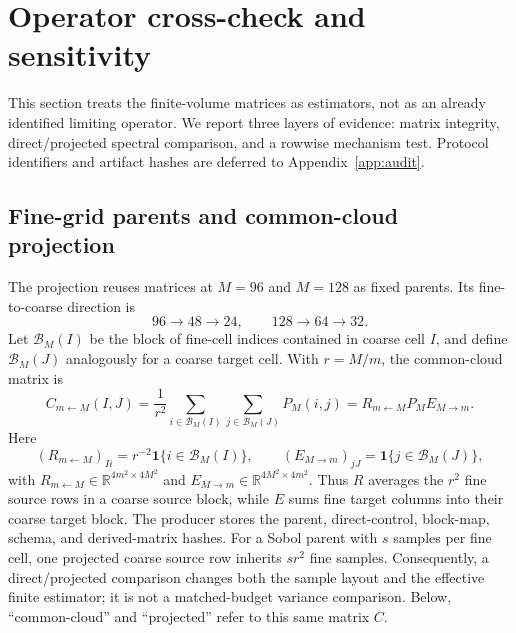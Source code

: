 \section{Operator cross-check and sensitivity}
\label{sec:operator}

This section treats the finite-volume matrices as estimators, not as an already
identified limiting operator.  We report three layers of evidence: matrix
integrity, direct/projected spectral comparison, and a rowwise mechanism test.
Protocol identifiers and artifact hashes are deferred to
Appendix~\ref{app:audit}.

\subsection{Fine-grid parents and common-cloud projection}
\label{sec:r061}

The projection reuses matrices at $M=96$ and $M=128$ as fixed parents.  Its
fine-to-coarse direction is
\begin{equation}
  96\longrightarrow48\longrightarrow24,
  \qquad
  128\longrightarrow64\longrightarrow32.
  \label{eq:chains}
\end{equation}
Let $\mathcal B_M(I)$ be the block of fine-cell indices contained in coarse
cell $I$, and define $\mathcal B_M(J)$ analogously for a coarse target cell.
With $r=M/m$, the common-cloud matrix is
\begin{equation}
 C_{m\leftarrow M}(I,J)=
 \frac{1}{r^2}\sum_{i\in \mathcal B_M(I)}
 \sum_{j\in \mathcal B_M(J)}P_M(i,j)
 =R_{m\leftarrow M}P_ME_{M\to m}.
 \label{eq:common-cloud}
\end{equation}
Here
\begin{equation}
 (R_{m\leftarrow M})_{Ii}=r^{-2}\mathbf 1\{i\in \mathcal B_M(I)\},
 \qquad
 (E_{M\to m})_{jJ}=\mathbf 1\{j\in \mathcal B_M(J)\},
 \label{eq:restriction-extension}
\end{equation}
with
$R_{m\leftarrow M}\in\mathbb R^{4m^2\times4M^2}$ and
$E_{M\to m}\in\mathbb R^{4M^2\times4m^2}$.  Thus $R$ averages the $r^2$
fine source rows in a coarse source block, while $E$ sums fine target columns
into their coarse target block.  The producer stores the parent, direct-control,
block-map, schema, and derived-matrix hashes.  For a Sobol parent with $s$
samples per fine cell, one projected coarse source row inherits $sr^2$ fine
samples.  Consequently, a direct/projected comparison changes both the sample
layout and the effective finite estimator; it is not a matched-budget variance
comparison.
Below, ``common-cloud'' and ``projected'' refer to this same matrix $C$.

